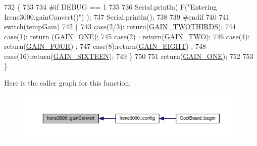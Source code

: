 \begin{DoxyCode}
732 \{
733 
734 \textcolor{preprocessor}{#if DEBUG == 1 }
735 
736     Serial.println( F(\textcolor{stringliteral}{"Entering Irene3000.gainConvert()"}) );
737     Serial.println();
738 
739 \textcolor{preprocessor}{#endif }
740     
741     \textcolor{keywordflow}{switch}(tempGain)
742     \{
743         \textcolor{keywordflow}{case}(2/3): \textcolor{keywordflow}{return}(\hyperlink{_cool_adafruit___a_d_s1015_8h_a3d6c0e15829a207b9155890811fa4781a879d688347ec0bf159fe1278db602f68}{GAIN\_TWOTHIRDS});
744         \textcolor{keywordflow}{case}(1): \textcolor{keywordflow}{return} (\hyperlink{_cool_adafruit___a_d_s1015_8h_a3d6c0e15829a207b9155890811fa4781ab6b0b520637e016e297110bebeb23a54}{GAIN\_ONE});
745         \textcolor{keywordflow}{case}(2) : \textcolor{keywordflow}{return}(\hyperlink{_cool_adafruit___a_d_s1015_8h_a3d6c0e15829a207b9155890811fa4781a447f66a13d0dfbe92462e35f1307cc0d}{GAIN\_TWO});
746         \textcolor{keywordflow}{case}(4): \textcolor{keywordflow}{return}(\hyperlink{_cool_adafruit___a_d_s1015_8h_a3d6c0e15829a207b9155890811fa4781a33fa5521f4e806b7438052fcdbbf8660}{GAIN\_FOUR}) ;   
747         \textcolor{keywordflow}{case}(8):\textcolor{keywordflow}{return}(\hyperlink{_cool_adafruit___a_d_s1015_8h_a3d6c0e15829a207b9155890811fa4781af284da818fc21db27c5ffcfaff7047cb}{GAIN\_EIGHT})  ;  
748         \textcolor{keywordflow}{case}(16):\textcolor{keywordflow}{return}(\hyperlink{_cool_adafruit___a_d_s1015_8h_a3d6c0e15829a207b9155890811fa4781a08fc581748aedabe657bb8aa9464d734}{GAIN\_SIXTEEN});  
749     \}
750 
751     \textcolor{keywordflow}{return}(\hyperlink{_cool_adafruit___a_d_s1015_8h_a3d6c0e15829a207b9155890811fa4781ab6b0b520637e016e297110bebeb23a54}{GAIN\_ONE});
752 
753 \}
\end{DoxyCode}
Here is the caller graph for this function\+:\nopagebreak
\begin{figure}[H]
\begin{center}
\leavevmode
\includegraphics[width=350pt]{d6/d03/class_irene3000_abcad62d1201a59f8dd3ba87048002728_icgraph}
\end{center}
\end{figure}
\mbox{\label{class_irene3000_a7bc2414100b5e19eacc6630fa34b2654}} 
